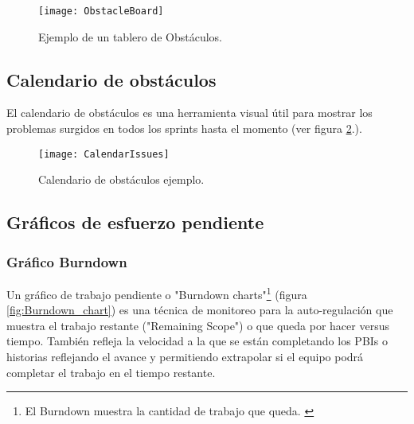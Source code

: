 \begin{figure}[h]
  \centering
  \texttt{[image: ObstacleBoard]}
  \caption{Ejemplo de un tablero de Obstáculos.}
  \centering
  \label{fig:ObstacleBoard} %
\end{figure}
\FloatBarrier %

\subsection{Calendario de obstáculos}

El calendario de obstáculos es una herramienta visual útil para mostrar los problemas surgidos en todos los sprints hasta el momento (ver figura \ref{fig:CalendarIssues}.).

\begin{figure}[h]
  \centering
  \texttt{[image: CalendarIssues]}
  \caption{Calendario de obstáculos ejemplo.}
  \centering
  \label{fig:CalendarIssues} %
\end{figure}
\FloatBarrier %

\subsection{Gráficos de esfuerzo pendiente}

\subsubsection{Gráfico Burndown}

Un gráfico de trabajo pendiente o "Burndown charts"\footnote{El Burndown muestra la cantidad de trabajo que queda. \cite{SBOK-2013}} (figura \ref{fig:Burndown_chart}) es una técnica de monitoreo para la auto-regulación que muestra el trabajo restante ("Remaining Scope") o que queda por hacer versus tiempo. También refleja la velocidad a la que se están completando los PBIs o historias reflejando el avance y permitiendo extrapolar si el equipo podrá completar el trabajo en el tiempo restante.

